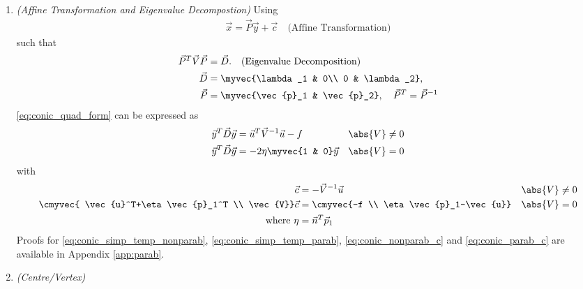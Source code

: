 \begin{enumerate}[label=\thesubsection.\arabic*.,ref=\thesubsection.\theenumi]
\item {\em (Affine Transformation and Eigenvalue Decompostion)}
Using 
\begin{align}
\vec{x} = \vec{P}\vec{y}+\vec{c} \quad \text{(Affine Transformation)}
\label{eq:conic_affine}
\end{align}
such that 
\begin{align}
\label{eq:conic_parmas_eig_def}
\vec{P}^T\vec{V}\vec{P} &= \vec{D}. \quad \text{(Eigenvalue Decomposition)}
\\
\vec{D} &= \myvec{\lambda_1 & 0\\ 0 & \lambda_2}, 
\\
\vec{P} &= \myvec{\vec{p}_1 & \vec{p}_2}, \quad \vec{P}^T=\vec{P}^{-1}
\end{align}
\eqref{eq:conic_quad_form} can be expressed as
\begin{align}
\label{eq:conic_simp_temp_nonparab}
\vec{y}^T\vec{D}\vec{y} &=  \vec{u}^T\vec{V}^{-1}\vec{u} -f  &  \abs{V} &\ne 0
\\
\vec{y}^T\vec{D}\vec{y} &=  -2\eta\myvec{1 & 0}\vec{y}   & \abs{V} &= 0
\label{eq:conic_simp_temp_parab}
\end{align}
with 
\begin{align}
\label{eq:conic_nonparab_c}
\vec{c} &= - \vec{V}^{-1}\vec{u} & \abs{V} &\ne 0
\\
\cmyvec{ \vec{u}^T+\eta\vec{p}_1^T \\ \vec{V}}\vec{c} &= \cmyvec{-f \\ \eta\vec{p}_1-\vec{u}}  &\abs{V} &= 0
\label{eq:conic_parab_c}
\\
\text{where } \eta &=\vec{n}^T\vec{p}_1
\end{align}
\solution
%
 Proofs for \eqref{eq:conic_simp_temp_nonparab},
\eqref{eq:conic_simp_temp_parab}, \eqref{eq:conic_nonparab_c}
 and \eqref{eq:conic_parab_c}
are available in Appendix \ref{app:parab}.
%
\item {\em (Centre/Vertex)}

\end{enumerate}
